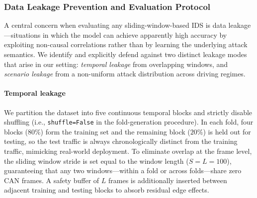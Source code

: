 \documentclass[lettersize,journal]{IEEEtran}
\begin{document}
\subsubsection{Data Leakage Prevention and Evaluation Protocol} 
\label{sec:dataset_protocol}
A central concern when evaluating any sliding-window-based IDS is 
data leakage---situations in which the model can achieve apparently 
high accuracy by exploiting non-causal correlations rather than by 
learning the underlying attack semantics. We identify and explicitly 
defend against two distinct leakage modes that arise in our setting: 
\emph{temporal leakage} from overlapping windows, and 
\emph{scenario leakage} from a non-uniform attack distribution 
across driving regimes.

\paragraph*{Temporal leakage}
We partition the dataset into five continuous temporal blocks and 
strictly disable shuffling (i.e., \texttt{shuffle=False} in the 
fold-generation procedure). In each fold, four blocks ($80\%$) form 
the training set and the remaining block ($20\%$) is held out for 
testing, so the test traffic is always chronologically distinct from 
the training traffic, mimicking real-world deployment. To eliminate 
overlap at the frame level, the sliding window stride is set equal 
to the window length ($S = L = 100$), guaranteeing that any two 
windows---within a fold or across folds---share zero CAN frames. A 
safety buffer of $L$ frames is additionally inserted between adjacent 
training and testing blocks to absorb residual edge effects.
\end{document}
